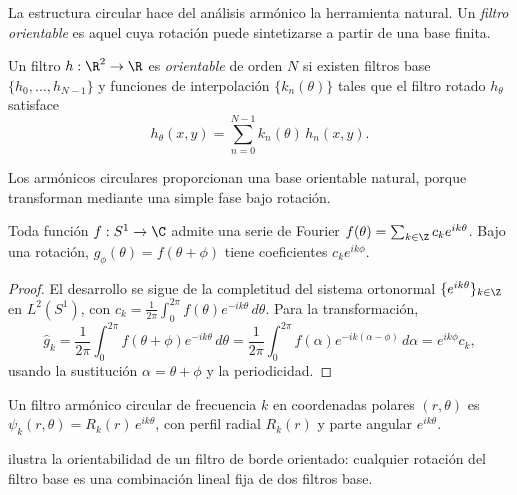 La estructura circular hace del an\'alisis arm\'onico la herramienta natural. Un
\emph{filtro orientable} es aquel cuya rotaci\'on puede sintetizarse a partir de
una base finita.

\begin{definition}
\label{def:groups:steerable-filter}
Un filtro $h: \R^2 \to \R$ es \emph{orientable} de orden $N$ si existen filtros
base $\{h_0, \dots, h_{N-1}\}$ y funciones de interpolaci\'on $\{k_n(\theta)\}$
tales que el filtro rotado $h_\theta$ satisface
\begin{equation}
  h_\theta(x,y) = \sum_{n=0}^{N-1} k_n(\theta)\, h_n(x,y).
\end{equation}
\end{definition}

Los arm\'onicos circulares proporcionan una base orientable natural, porque
transforman mediante una simple fase bajo rotaci\'on.

\begin{theorem}
\label{thm:groups:circular-harmonics}
Toda funci\'on $f: S^1 \to \C$ admite una serie de Fourier $f(\theta) = \sum_{k
\in \Z} c_k e^{ik\theta}$. Bajo una rotaci\'on, $g_\phi(\theta) = f(\theta +
\phi)$ tiene coeficientes $c_k e^{ik\phi}$.
\end{theorem}

\begin{proof}
El desarrollo se sigue de la completitud del sistema ortonormal
$\{e^{ik\theta}\}_{k \in \Z}$ en $L^2(S^1)$, con $c_k = \frac{1}{2\pi}
\int_0^{2\pi} f(\theta) e^{-ik\theta}\,d\theta$. Para la transformaci\'on,
\[
  \hat g_k = \frac{1}{2\pi}\int_0^{2\pi} f(\theta + \phi) e^{-ik\theta}\,d\theta
  = \frac{1}{2\pi}\int_0^{2\pi} f(\alpha) e^{-ik(\alpha - \phi)}\,d\alpha
  = e^{ik\phi} c_k,
\]
usando la sustituci\'on $\alpha = \theta + \phi$ y la periodicidad.
\end{proof}

\begin{definition}
\label{def:groups:circular-harmonic-filter}
Un filtro arm\'onico circular de frecuencia $k$ en coordenadas polares $(r,
\theta)$ es $\psi_k(r, \theta) = R_k(r)\, e^{ik\theta}$, con perfil radial
$R_k(r)$ y parte angular $e^{ik\theta}$.
\end{definition}

 ilustra la orientabilidad de un filtro de borde
orientado: cualquier rotaci\'on del filtro base es una combinaci\'on lineal fija
de dos filtros base.

